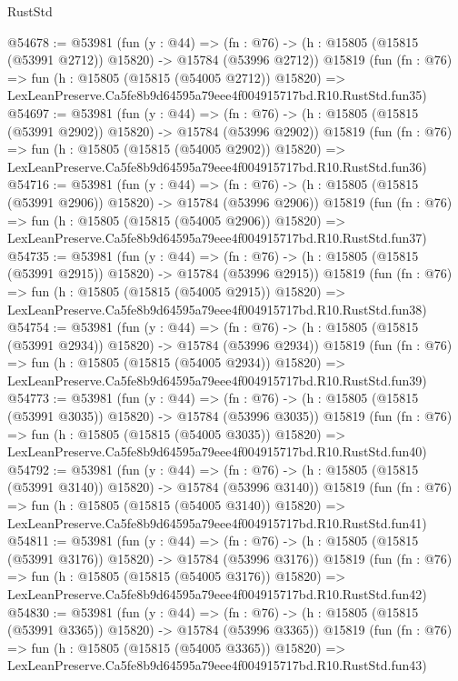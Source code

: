 \begin{lexlean}{RustStd}
\begin{coremodule}
@54678 := @53981
    (fun (y : @44) =>
    (fn : @76) -> (h : @15805 (@15815 (@53991 @2712)) @15820) -> @15784 (@53996 @2712))
    @15819
    (fun (fn : @76) =>
    fun (h : @15805 (@15815 (@54005 @2712)) @15820) =>
    LexLeanPreserve.Ca5fe8b9d64595a79eee4f004915717bd.R10.RustStd.fun35)
@54697 := @53981
    (fun (y : @44) =>
    (fn : @76) -> (h : @15805 (@15815 (@53991 @2902)) @15820) -> @15784 (@53996 @2902))
    @15819
    (fun (fn : @76) =>
    fun (h : @15805 (@15815 (@54005 @2902)) @15820) =>
    LexLeanPreserve.Ca5fe8b9d64595a79eee4f004915717bd.R10.RustStd.fun36)
@54716 := @53981
    (fun (y : @44) =>
    (fn : @76) -> (h : @15805 (@15815 (@53991 @2906)) @15820) -> @15784 (@53996 @2906))
    @15819
    (fun (fn : @76) =>
    fun (h : @15805 (@15815 (@54005 @2906)) @15820) =>
    LexLeanPreserve.Ca5fe8b9d64595a79eee4f004915717bd.R10.RustStd.fun37)
@54735 := @53981
    (fun (y : @44) =>
    (fn : @76) -> (h : @15805 (@15815 (@53991 @2915)) @15820) -> @15784 (@53996 @2915))
    @15819
    (fun (fn : @76) =>
    fun (h : @15805 (@15815 (@54005 @2915)) @15820) =>
    LexLeanPreserve.Ca5fe8b9d64595a79eee4f004915717bd.R10.RustStd.fun38)
@54754 := @53981
    (fun (y : @44) =>
    (fn : @76) -> (h : @15805 (@15815 (@53991 @2934)) @15820) -> @15784 (@53996 @2934))
    @15819
    (fun (fn : @76) =>
    fun (h : @15805 (@15815 (@54005 @2934)) @15820) =>
    LexLeanPreserve.Ca5fe8b9d64595a79eee4f004915717bd.R10.RustStd.fun39)
@54773 := @53981
    (fun (y : @44) =>
    (fn : @76) -> (h : @15805 (@15815 (@53991 @3035)) @15820) -> @15784 (@53996 @3035))
    @15819
    (fun (fn : @76) =>
    fun (h : @15805 (@15815 (@54005 @3035)) @15820) =>
    LexLeanPreserve.Ca5fe8b9d64595a79eee4f004915717bd.R10.RustStd.fun40)
@54792 := @53981
    (fun (y : @44) =>
    (fn : @76) -> (h : @15805 (@15815 (@53991 @3140)) @15820) -> @15784 (@53996 @3140))
    @15819
    (fun (fn : @76) =>
    fun (h : @15805 (@15815 (@54005 @3140)) @15820) =>
    LexLeanPreserve.Ca5fe8b9d64595a79eee4f004915717bd.R10.RustStd.fun41)
@54811 := @53981
    (fun (y : @44) =>
    (fn : @76) -> (h : @15805 (@15815 (@53991 @3176)) @15820) -> @15784 (@53996 @3176))
    @15819
    (fun (fn : @76) =>
    fun (h : @15805 (@15815 (@54005 @3176)) @15820) =>
    LexLeanPreserve.Ca5fe8b9d64595a79eee4f004915717bd.R10.RustStd.fun42)
@54830 := @53981
    (fun (y : @44) =>
    (fn : @76) -> (h : @15805 (@15815 (@53991 @3365)) @15820) -> @15784 (@53996 @3365))
    @15819
    (fun (fn : @76) =>
    fun (h : @15805 (@15815 (@54005 @3365)) @15820) =>
    LexLeanPreserve.Ca5fe8b9d64595a79eee4f004915717bd.R10.RustStd.fun43)

\end{coremodule}
\end{lexlean}
